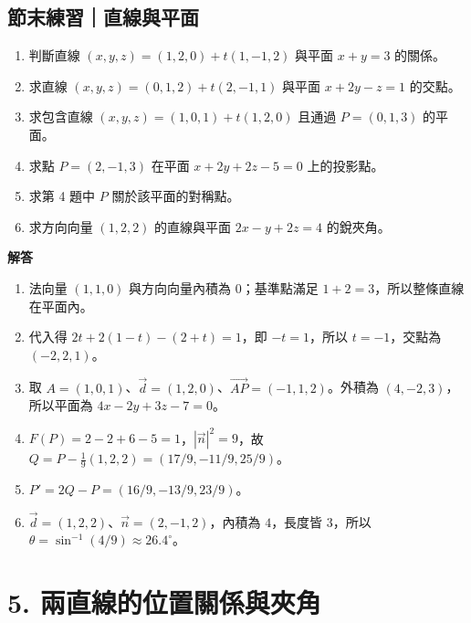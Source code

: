 \documentclass[11pt,a4paper]{article}
\providecommand{\tightlist}{%
  \setlength{\itemsep}{0pt}\setlength{\parskip}{0pt}}
\begin{document}
\begin{HandoutSelfCheck}

\subsection{節末練習｜直線與平面}\label{ux7bc0ux672bux7df4ux7fd2ux76f4ux7ddaux8207ux5e73ux9762}

\begin{enumerate}
\def\labelenumi{\arabic{enumi}.}
\tightlist
\item
  判斷直線 \((x,y,z)=(1,2,0)+t(1,-1,2)\) 與平面 \(x+y=3\) 的關係。
\item
  求直線 \((x,y,z)=(0,1,2)+t(2,-1,1)\) 與平面 \(x+2y-z=1\) 的交點。
\item
  求包含直線 \((x,y,z)=(1,0,1)+t(1,2,0)\) 且通過 \(P=(0,1,3)\) 的平面。
\item
  求點 \(P=(2,-1,3)\) 在平面 \(x+2y+2z-5=0\) 上的投影點。
\item
  求第 4 題中 \(P\) 關於該平面的對稱點。
\item
  求方向向量 \((1,2,2)\) 的直線與平面 \(2x-y+2z=4\) 的銳夾角。
\end{enumerate}

\textbf{解答}

\begin{enumerate}
\def\labelenumi{\arabic{enumi}.}
\tightlist
\item
  法向量 \((1,1,0)\) 與方向向量內積為 \(0\)；基準點滿足 \(1+2=3\)，所以整條直線在平面內。
\item
  代入得 \(2t+2(1-t)-(2+t)=1\)，即 \(-t=1\)，所以 \(t=-1\)，交點為 \(\boxed{(-2,2,1)}\)。
\item
  取 \(A=(1,0,1)\)、\(\vec d=(1,2,0)\)、\(\overrightarrow{AP}=(-1,1,2)\)。外積為 \((4,-2,3)\)，所以平面為 \(\boxed{4x-2y+3z-7=0}\)。
\item
  \(F(P)=2-2+6-5=1\)，\(|\vec n|^2=9\)，故 \(Q=P-\tfrac19(1,2,2)=\boxed{(17/9,-11/9,25/9)}\)。
\item
  \(P'=2Q-P=\boxed{(16/9,-13/9,23/9)}\)。
\item
  \(\vec d=(1,2,2)\)、\(\vec n=(2,-1,2)\)，內積為 \(4\)，長度皆 \(3\)，所以 \(\theta=\sin^{-1}(4/9)\approx26.4^\circ\)。
\end{enumerate}

\end{HandoutSelfCheck}

\section{5. 兩直線的位置關係與夾角}\label{ux5169ux76f4ux7ddaux7684ux4f4dux7f6eux95dcux4fc2ux8207ux593eux89d2}
\end{document}
